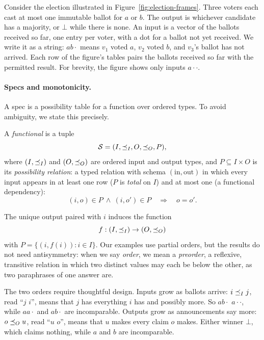 Consider the election illustrated in
Figure~\ref{fig:election-frames}.  Three voters each cast at most one immutable
ballot for $a$ or $b$.  The output is whichever candidate has a majority, or
$\bot$ while there is none.  An input is a vector of the ballots received so
far, one entry per voter, with a dot for a ballot not yet received.  We write
it as a string: $ab\cdot$ means $v_1$ voted $a$, $v_2$ voted $b$, and $v_3$'s
ballot has not arrived.  Each row of the figure's tables pairs the ballots
received so far with the permitted result.  For brevity, the figure shows only
inputs \inrelpart $a\cdot\cdot$.

\paragraph{Specs and monotonicity.}
A spec is a possibility table for a function over ordered types.  To avoid
ambiguity, we state this precisely.

\begin{definition}
\label{def:functional-specification}
A \emph{functional \spectype} is a tuple
\[
  \mathcal{S}=(I,\preceq_I,O,\preceq_O,P),
\]
  where $(I,\preceq_I)$ and $(O,\preceq_O)$ are ordered input and
  output types, and $P\subseteq I\times O$ is its \emph{possibility relation}:
  a typed relation with schema $(\mathrm{in},\mathrm{out})$ in which every
  input appears in at least one row ($P$ is \emph{total} on $I$) and at most one
  (a functional dependency):
\[
  (i,o)\in P\ \land\ (i,o')\in P
  \quad\Longrightarrow\quad o=o'.
\]
\end{definition}

The unique output paired with $i$ induces the function
\[f:(I,\preceq_I)\to(O,\preceq_O)\]
with $P=\{(i,f(i)):i\in I\}.$  Our examples use partial orders, but the results do not need antisymmetry:
when we say \emph{order}, we mean a \emph{preorder}, a reflexive, transitive
relation in which two distinct values may each be below the other, as two
paraphrases of one answer are.

The two orders require thoughtful design.
Inputs grow as ballots arrive: $i\preceq_I j$, read ``$j$ \emph{\inrel} $i$'', means that
$j$ has everything $i$ has and possibly more. So $ab\cdot$ \inrel $a\cdot\cdot$,
while $aa\cdot$ and $ab\cdot$ are incomparable. Outputs grow as announcements
say more: $o\preceq_O u$, read ``$u$ \outrel $o$'', means that $u$ makes every
claim $o$ makes. Either winner \outrel $\bot$, which claims nothing, while $a$
and $b$ are incomparable.

